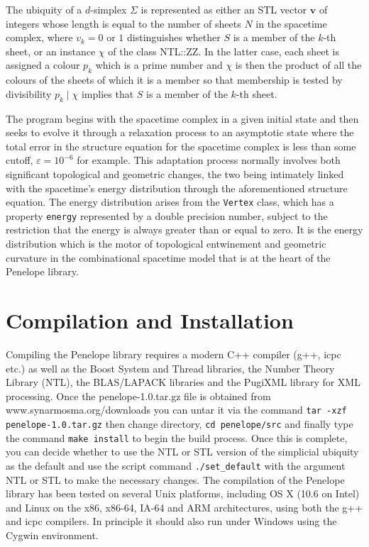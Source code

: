 \documentclass[12pt,letterpaper]{report}
\begin{document}
The ubiquity of a $d$-simplex $\Sigma$ is represented as either an STL vector $\mathbf{v}$ of integers 
whose length is equal to the number of sheets $N$ in the spacetime complex, where $v_k=0$ or 
$1$ distinguishes whether $S$ is a member of the $k$-th sheet, or an instance $\chi$ of the 
class NTL::ZZ. In the latter case, each sheet is assigned a colour $p_k$ which is a prime number 
and $\chi$ is then the product of all the colours of the sheets of which it is a member so that 
membership is tested by divisibility $p_k \mid \chi$ implies that $S$ is a member of the $k$-th 
sheet. 

The program begins with the spacetime complex in a given initial state and then seeks to 
evolve it through a relaxation process to an asymptotic state where the total error in the 
structure equation for the spacetime complex is less than some cutoff, $\varepsilon = 10^{-6}$ 
for example. This adaptation process normally involves both significant topological and 
geometric changes, the two being intimately linked with the spacetime's energy distribution 
through the aforementioned structure equation. The energy distribution arises from the 
\texttt{Vertex} class, which has a property \texttt{energy} represented by a double precision 
number, subject to the restriction that the energy is always greater than or equal to zero. 
It is the energy distribution which is the motor of topological entwinement and geometric 
curvature in the combinational spacetime model that is at the heart of the Penelope library.  

\section{Compilation and Installation}

Compiling the Penelope library requires a modern C++ compiler (g++, icpc etc.) as well as 
the Boost System and Thread libraries, the Number Theory Library (NTL), the BLAS/LAPACK 
libraries and the PugiXML library for XML processing. Once the penelope-1.0.tar.gz file is 
obtained from www.synarmosma.org/downloads you can untar it via the command\newline
\texttt{tar -xzf penelope-1.0.tar.gz}\newline
then change directory,\newline
\texttt{cd penelope/src}\newline  
and finally type the command \texttt{make install} to begin the build process. Once this is 
complete, you can decide whether to use the NTL or STL version of the simplicial ubiquity 
as the default and use the script command \texttt{./set\_default} with the argument NTL or STL 
to make the necessary changes. The compilation of the Penelope library has been 
tested on several Unix platforms, including OS X (10.6 on Intel) and Linux on the x86, 
x86-64, IA-64 and ARM architectures, using both the g++ and icpc compilers. In principle it 
should also run under Windows using the Cygwin environment. 
\end{document}
